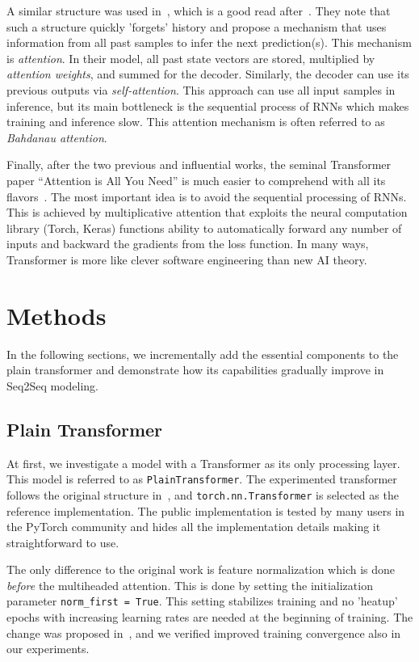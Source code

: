 \documentclass[final]{article}
\begin{document}
A similar structure was used in~\cite{Cho-2014-emnlp}, which is a good
read after~\cite{Sutskever-2014-neurips}. They note that such a
structure quickly 'forgets' history and propose a mechanism that uses
information from all past samples to infer the next prediction(s).
This mechanism is \textit{attention}. In their model,  all past state
vectors are stored, multiplied by \textit{attention weights}, and
summed for the decoder. Similarly, the decoder can use its previous
outputs via \textit{self-attention}. This approach can use all input samples in
inference, but its main bottleneck is the sequential process of RNNs
which makes training and inference slow. This attention mechanism is
often referred to as \textit{Bahdanau attention}.

Finally, after the two previous and influential works, the seminal
Transformer paper ``Attention is All You Need'' is much easier to
comprehend with all its flavors~\cite{transformer}. The most important
idea is to avoid the sequential processing of RNNs. This is achieved
by multiplicative attention that exploits the neural computation
library (Torch, Keras) functions ability to automatically forward any
number of inputs and backward the gradients from the loss function. In
many ways, Transformer is more like clever software engineering than
new AI theory.


\section{Methods}

In the following sections, we incrementally add the essential
components to the plain transformer and demonstrate how its
capabilities gradually improve in Seq2Seq modeling.

\subsection{Plain Transformer}
\label{sec:PlainTransformer}

At first, we investigate a model with a Transformer as its only
processing layer.
This model is referred to as \texttt{PlainTransformer}.
The experimented transformer follows the original structure
in~\cite{transformer}, and \texttt{torch.nn.Transformer} is selected
as the reference implementation. The public implementation is tested
by many users in the PyTorch community and hides all the
implementation details making it straightforward to use.

The only difference to the original work is feature normalization
which is done \textit{before} the multiheaded attention.
This is done by setting the initialization parameter
\texttt{norm\_first = True}. This setting stabilizes training and no
’heatup’ epochs with increasing learning rates are needed at the
beginning of training.
The change was proposed
in~\cite{Xiong-2020-icml}, and we verified improved training
convergence also in our experiments.
\end{document}
